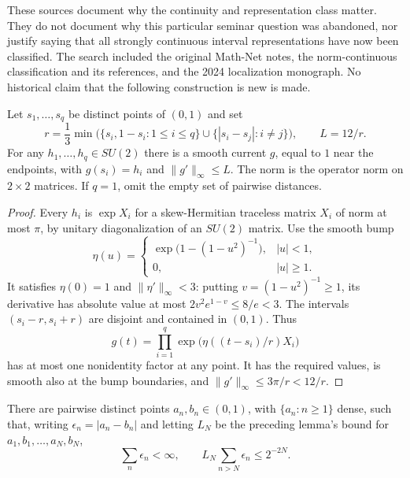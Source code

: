 These sources document why the continuity and representation class
matter. They do not document why this particular seminar question was
abandoned, nor justify saying that all strongly continuous interval
representations have now been classified. The search included the
original Math-Net notes, the norm-continuous classification and its
references, and the 2024 localization monograph. No historical claim
that the following construction is new is made.

\begin{lemma}\ours{}
\label{lem:interpolation}
Let $s_1,\ldots,s_q$ be distinct points of $(0,1)$ and set
\[
 r=\frac13\min\bigl(\{s_i,1-s_i:1\leq i\leq q\}
       \cup\{|s_i-s_j|:i\ne j\}\bigr),\qquad L=12/r.
\]
For any $h_1,\ldots,h_q\in SU(2)$ there is a smooth current $g$,
equal to $1$ near the endpoints, with $g(s_i)=h_i$ and
$\|g'\|_\infty\leq L$. The norm is the operator norm on $2\times2$
matrices. If $q=1$, omit the empty set of pairwise distances.
\end{lemma}

\begin{proof}
Every $h_i$ is $\exp X_i$ for a skew-Hermitian traceless matrix $X_i$
of norm at most $\pi$, by unitary diagonalization of an $SU(2)$ matrix.
Use the smooth bump
\[
 \eta(u)=\begin{cases}
 \exp\bigl(1-(1-u^2)^{-1}\bigr),&|u|<1,\\
 0,&|u|\geq1.
 \end{cases}
\]
It satisfies $\eta(0)=1$ and $\|\eta'\|_\infty<3$: putting
$v=(1-u^2)^{-1}\geq1$, its derivative has absolute value at most
$2v^2e^{1-v}\leq8/e<3$. The intervals $(s_i-r,s_i+r)$ are disjoint
and contained in $(0,1)$. Thus
\[
 g(t)=\prod_{i=1}^q\exp\bigl(\eta((t-s_i)/r)X_i\bigr)
\]
has at most one nonidentity factor at any point. It has the required
values, is smooth also at the bump boundaries, and
$\|g'\|_\infty\leq3\pi/r<12/r$.
\end{proof}

\begin{lemma}\ours{}
\label{lem:pairs}
There are pairwise distinct points $a_n,b_n\in(0,1)$, with
$\{a_n:n\geq1\}$ dense, such that, writing
$\epsilon_n=|a_n-b_n|$ and letting $L_N$ be the preceding lemma's
bound for $a_1,b_1,\ldots,a_N,b_N$,
\[
 \sum_n\epsilon_n<\infty,
 \qquad L_N\sum_{n>N}\epsilon_n\leq 2^{-2N}.
 \tag{1}\label{eq:pairtail}
\]
\end{lemma}


